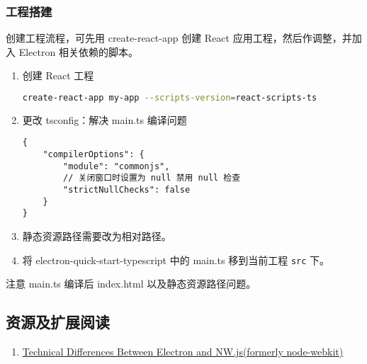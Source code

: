 \subsubsection{工程搭建}\label{ux5de5ux7a0bux642dux5efa}

创建工程流程，可先用 create-react-app 创建 React
应用工程，然后作调整，并加入 Electron 相关依赖的脚本。

\begin{enumerate}
\def\labelenumi{\arabic{enumi}.}
\item
  创建 React 工程

\begin{lstlisting}[language=bash]
create-react-app my-app --scripts-version=react-scripts-ts
\end{lstlisting}
\item
  更改 tsconfig：解决 main.ts 编译问题

\begin{lstlisting}
{
    "compilerOptions": {
        "module": "commonjs",
        // 关闭窗口时设置为 null 禁用 null 检查
        "strictNullChecks": false
    }
}
\end{lstlisting}
\item
  静态资源路径需要改为相对路径。
\item
  将 electron-quick-start-typescript 中的 main.ts 移到当前工程
  \lstinline!src! 下。
\end{enumerate}

注意 main.ts 编译后 index.html 以及静态资源路径问题。

\subsection{资源及扩展阅读}\label{ux8d44ux6e90ux53caux6269ux5c55ux9605ux8bfb}

\begin{enumerate}
\def\labelenumi{\arabic{enumi}.}
\tightlist
\item
  \href{https://electronjs.org/docs/development/atom-shell-vs-node-webkit}{Technical
  Differences Between Electron and NW.js(formerly node-webkit)}
\end{enumerate}
